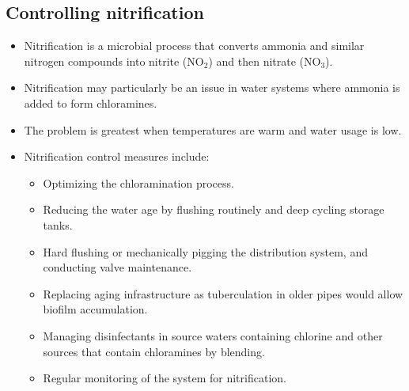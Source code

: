 \subsection{Controlling nitrification} 
\begin{itemize}
\item Nitrification is a microbial process that converts ammonia and similar nitrogen compounds into nitrite (NO$_2$) and then nitrate (NO$_3$).
\item Nitrification may particularly be an issue in water systems where ammonia is added to form chloramines.
\item The problem is greatest when temperatures are warm and water usage is low.
\item Nitrification control measures include:
\begin{itemize}
\item Optimizing the chloramination process.
\item Reducing the water age by flushing routinely and deep cycling storage tanks.
\item Hard flushing or mechanically pigging the distribution system, and conducting valve maintenance.
\item Replacing aging infrastructure as tuberculation in older pipes would allow biofilm accumulation.
\item Managing disinfectants in source waters containing chlorine and other sources that contain chloramines by blending.
\item Regular monitoring of the system for nitrification.
\end{itemize}
\end{itemize}



